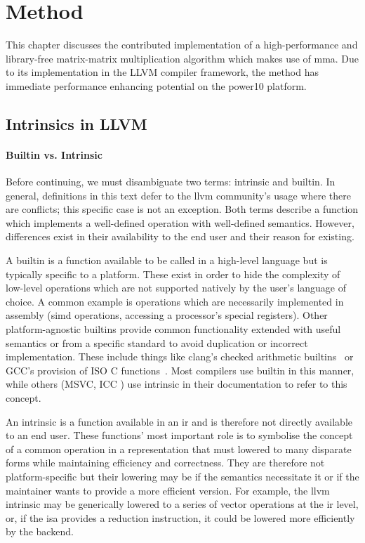 \documentclass[\main/thesis.tex]{subfiles}
\begin{document}
\chapter{Method}
\label{cha:method}
This chapter discusses the contributed implementation of a high-performance and library-free matrix-matrix multiplication algorithm which makes use of \gls{mma}.
Due to its implementation in the LLVM compiler framework, the method has immediate performance enhancing potential on the \gls{power10} platform.

\section{Intrinsics in LLVM}
\subsubsection{Builtin vs. Intrinsic}
Before continuing, we must disambiguate two terms: \gls{intrinsic} and \gls{builtin}.
In general, definitions in this text defer to the \gls{llvm} community's usage where there are conflicts; this specific case is not an exception.
Both terms describe a function which implements a well-defined operation with well-defined semantics.
However, differences exist in their availability to the end user and their reason for existing.

A \gls{builtin} is a function available to be called in a high-level language but is typically specific to a platform.
These exist in order to hide the complexity of low-level operations which are not supported natively by the user's language of choice.
A common example is operations which are necessarily implemented in assembly (\eg \gls{simd} operations, accessing a processor's special registers).
Other platform-agnostic \glspl{builtin} provide common functionality extended with useful semantics or from a specific standard to avoid duplication or incorrect implementation.
These include things like \gls{clang}'s checked arithmetic builtins~\autocite{llvmCheckArith} or GCC's provision of ISO C functions~\autocite{gccOtherBuiltins}.
Most compilers use \gls{builtin} in this manner, while others (\eg MSVC, ICC ) use \gls{intrinsic} in their documentation to refer to this concept.

An \gls{intrinsic} is a function available in an \gls{ir} and is therefore not directly available to an end user.
These functions' most important role is to symbolise the concept of a common operation in a representation that must lowered to many disparate forms while maintaining efficiency and correctness.
They are therefore not platform-specific but their lowering may be if the semantics necessitate it or if the maintainer wants to provide a more efficient version.
For example, the \gls{llvm} \gls{intrinsic}  may be generically lowered to a series of vector operations at the \gls{ir} level, or, if the \gls{isa} provides a reduction instruction, it could be lowered more efficiently by the backend.
\end{document}
